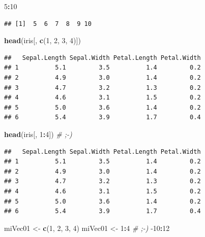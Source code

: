\documentclass[
]{book}
\newenvironment{Shaded}{\begin{snugshade}}{\end{snugshade}}
\newcommand{\CommentTok}[1]{\textcolor[rgb]{0.56,0.35,0.01}{\textit{#1}}}
\newcommand{\DecValTok}[1]{\textcolor[rgb]{0.00,0.00,0.81}{#1}}
\newcommand{\KeywordTok}[1]{\textcolor[rgb]{0.13,0.29,0.53}{\textbf{#1}}}
\newcommand{\NormalTok}[1]{#1}
\newcommand{\OperatorTok}[1]{\textcolor[rgb]{0.81,0.36,0.00}{\textbf{#1}}}
\newcommand{\StringTok}[1]{\textcolor[rgb]{0.31,0.60,0.02}{#1}}
\begin{document}
\begin{Shaded}
\begin{Highlighting}[]
\DecValTok{5}\OperatorTok{:}\DecValTok{10}
\end{Highlighting}
\end{Shaded}

\begin{verbatim}
## [1]  5  6  7  8  9 10
\end{verbatim}

\begin{Shaded}
\begin{Highlighting}[]
\KeywordTok{head}\NormalTok{(iris[, }\KeywordTok{c}\NormalTok{(}\DecValTok{1}\NormalTok{, }\DecValTok{2}\NormalTok{, }\DecValTok{3}\NormalTok{, }\DecValTok{4}\NormalTok{)])}
\end{Highlighting}
\end{Shaded}

\begin{verbatim}
##   Sepal.Length Sepal.Width Petal.Length Petal.Width
## 1          5.1         3.5          1.4         0.2
## 2          4.9         3.0          1.4         0.2
## 3          4.7         3.2          1.3         0.2
## 4          4.6         3.1          1.5         0.2
## 5          5.0         3.6          1.4         0.2
## 6          5.4         3.9          1.7         0.4
\end{verbatim}

\begin{Shaded}
\begin{Highlighting}[]
\KeywordTok{head}\NormalTok{(iris[, }\DecValTok{1}\OperatorTok{:}\DecValTok{4}\NormalTok{]) }\CommentTok{# ;-)}
\end{Highlighting}
\end{Shaded}

\begin{verbatim}
##   Sepal.Length Sepal.Width Petal.Length Petal.Width
## 1          5.1         3.5          1.4         0.2
## 2          4.9         3.0          1.4         0.2
## 3          4.7         3.2          1.3         0.2
## 4          4.6         3.1          1.5         0.2
## 5          5.0         3.6          1.4         0.2
## 6          5.4         3.9          1.7         0.4
\end{verbatim}

\begin{Shaded}
\begin{Highlighting}[]
\NormalTok{miVec01 <-}\StringTok{ }\KeywordTok{c}\NormalTok{(}\DecValTok{1}\NormalTok{, }\DecValTok{2}\NormalTok{, }\DecValTok{3}\NormalTok{, }\DecValTok{4}\NormalTok{)}
\NormalTok{miVec01 <-}\StringTok{ }\DecValTok{1}\OperatorTok{:}\DecValTok{4} \CommentTok{# ;-)}
\DecValTok{-10}\OperatorTok{:}\DecValTok{12}
\end{Highlighting}
\end{Shaded}
\end{document}
